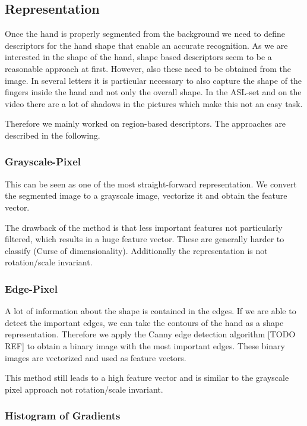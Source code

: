 \documentclass[letterpaper, 10 pt, conference]{ieeeconf}  %
\begin{document}
\subsection{Representation}

Once the hand is properly segmented from the background we need to define descriptors for the hand shape that enable an accurate recognition. As we are interested in the shape of the hand, shape based descriptors seem to be a reasonable approach at first. However, also these need to be obtained from the image. In several letters it is particular necessary to also capture the shape of the fingers inside the hand and not only the overall shape. In the ASL-set and on the video there are a lot of shadows in the pictures which make this not an easy task.

Therefore we mainly worked on region-based descriptors. The approaches are described in the following.

\subsubsection{Grayscale-Pixel}

This can be seen as one of the most straight-forward representation. We convert the segmented image to a grayscale image, vectorize it and obtain the feature vector.

The drawback of the method is that less important features not particularly filtered, which results in a huge feature vector. These are generally harder to classify (Curse of dimensionality). Additionally the representation is not rotation/scale invariant.

\subsubsection{Edge-Pixel}

A lot of information about the shape is contained in the edges. If we are able to detect the important edges, we can take the contours of the hand as a shape representation. Therefore we apply the Canny edge detection algorithm [TODO REF] to obtain a binary image with the most important edges. These binary images are vectorized and used as feature vectors.

This method still leads to a high feature vector and is similar to the grayscale pixel approach not rotation/scale invariant.

\subsubsection{Histogram of Gradients}
\end{document}
